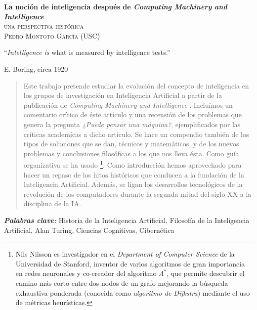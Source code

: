 \documentclass[12pt]{memoir}
\makeatletter
\newlength\drop
\newcommand*\titleM{\begingroup%
\setlength\drop{0.08\textheight}
\centering
\vspace*{\drop}
{\Huge\bfseries La noción de inteligencia después de \textit{Computing Machinery and Intelligence}}\\[\baselineskip]
{\scshape una perspectiva histórica}\\[\baselineskip]
\vfill
{\large\scshape Pedro Montoto García (USC)}\par
\vfill
{\scshape \@date}\par
\vspace*{2\drop}
\endgroup}
\providecommand{\keywords}[2]{
	\textbf{\textit{#1: }} #2
}
\makeatother
\begin{document}
\pagestyle{empty}




\begin{titlingpage}
\titleM
\end{titlingpage}

\OnehalfSpacing



\setlength{\epigraphwidth}{0.8\textwidth}
\thispagestyle{empty}
\epigraph{``\textit{Intelligence is} what is measured by intelligence tests.''}{E. Boring, circa 1920}
\newpage


\thispagestyle{empty}
\begin{abstract}
	Este trabajo pretende estudiar la evolución del concepto de inteligencia en los grupos de investigación en Inteligencia Artificial a partir de la publicación de \textit{Computing Machinery and Intelligence} \parencite{Turing1950cmi}. Incluímos un comentario crítico de éste artículo y una recensión de los problemas que genera la pregunta \textit{¿Puede pensar una máquina?}, ejemplificados por las críticas academícas a dicho artículo. Se hace un compendio también de los tipos de soluciones que se dan, técnicos y matemáticos, y de los nuevos problemas y conclusiones filosóficas a los que nos lleva ésta. Como guía organizativa se ha usado  \parencite{Nilsson2009}\footnote{Nils Nilsson es investigador en el \textit{Department of Computer Science} de la Universidad de Stanford, inventor de varios algoritmos de gran importancia en redes neuronales y co-creador del algoritmo $A^*$, que permite descubrir el camino más corto entre dos nodos de un grafo mejorando la búsqueda exhaustiva ponderada (conocida como \textit{algoritmo de Dijkstra}) mediante el uso de métricas heurísticas.}. Como introducción hemos aprovechado para hacer un repaso de los hitos históricos que conducen a la fundación de la Inteligencia Artificial. Además, se ligan los desarrollos tecnológicos de la revolución de los computadores durante la segunda mitad del siglo XX a la disciplina de la IA.
\end{abstract}

\keywords{Palabras clave}{Historia de la Inteligencia Artificial, Filosofía de la Inteligencia Artificial, Alan Turing, Ciencias Cognitivas, Cibernética}
\end{document}
